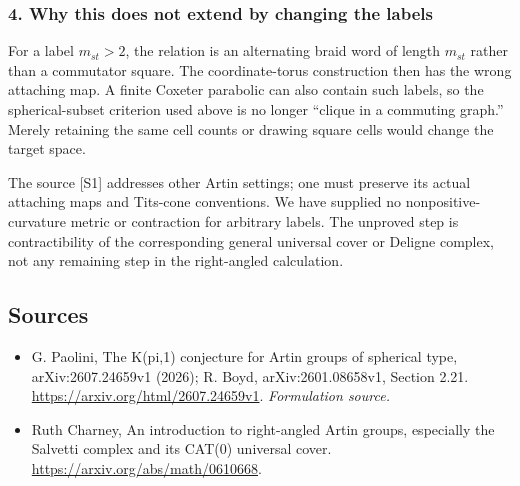 \documentclass[11pt]{article}
\begin{document}
\subsubsection{4. Why this does not extend by changing the labels}
For a label $m_{st}>2$, the relation is an alternating braid word of length $m_{st}$ rather than a commutator square. The coordinate-torus construction then has the wrong attaching map. A finite Coxeter parabolic can also contain such labels, so the spherical-subset criterion used above is no longer ``clique in a commuting graph.'' Merely retaining the same cell counts or drawing square cells would change the target space.

The source [S1] addresses other Artin settings; one must preserve its actual attaching maps and Tits-cone conventions. We have supplied no nonpositive-curvature metric or contraction for arbitrary labels. The unproved step is contractibility of the corresponding general universal cover or Deligne complex, not any remaining step in the right-angled calculation.

\subsection{Sources}
\begin{itemize}
\item[S1]G. Paolini, The K(pi,1) conjecture for Artin groups of spherical type, arXiv:2607.24659v1 (2026); R. Boyd, arXiv:2601.08658v1, Section 2.21.
\url{https://arxiv.org/html/2607.24659v1}.
\textit{Formulation source.}
\item[R1] Ruth Charney, An introduction to right-angled Artin groups, especially the Salvetti complex and its CAT(0) universal cover.
\url{https://arxiv.org/abs/math/0610668}.
\end{itemize}
\end{document}
